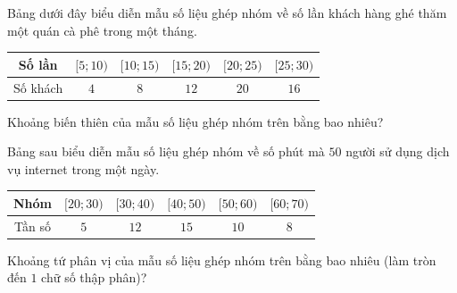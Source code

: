\begin{bt}%

	Bảng dưới đây biểu diễn mẫu số liệu ghép nhóm về số lần khách hàng ghé thăm một quán cà phê trong một tháng.
	\begin{center}
		\begin{tabular}{|c|c|c|c|c|c|}
			\hline Số lần & $[5 ; 10)$ & $[10 ; 15)$ & $[15 ; 20)$ & $[20 ; 25)$ & $[25 ; 30)$ \\
			\hline Số khách & $4$ & $8$ & $12$ & $20$ & $16$ \\
			\hline
		\end{tabular}
	\end{center}
	Khoảng biến thiên của mẫu số liệu ghép nhóm trên bằng bao nhiêu?
\end{bt}

\begin{bt}%

	Bảng sau biểu diễn mẫu số liệu ghép nhóm về số phút mà $50$ người sử dụng dịch vụ internet trong một ngày.
	\begin{center}
		\begin{tabular}{|c|c|c|c|c|c|}
			\hline Nhóm  & $[20 ; 30)$ & $[30 ; 40)$ & $[40 ; 50)$ & $[50 ; 60)$ & $[60 ; 70)$ \\
			\hline Tần số & $5$ & $12$ & $15$ & $10$ & $8$ \\
			\hline
		\end{tabular}
	\end{center}
	Khoảng tứ phân vị của mẫu số liệu ghép nhóm trên bằng bao nhiêu (làm tròn đến $1$ chữ số thập phân)?
\end{bt}

